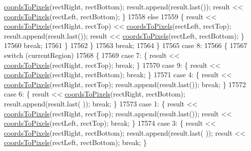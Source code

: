 \begin{DoxyCode}
      \hyperlink{class_q_c_p_abstract_plottable_ade710a776104b14c1c835168ce1bfc5c}{coordsToPixels}(rectRight, rectBottom); result.append(result.last()); result << 
      \hyperlink{class_q_c_p_abstract_plottable_ade710a776104b14c1c835168ce1bfc5c}{coordsToPixels}(rectLeft, rectBottom); \}
17558           \textcolor{keywordflow}{else}
17559           \{ result << \hyperlink{class_q_c_p_abstract_plottable_ade710a776104b14c1c835168ce1bfc5c}{coordsToPixels}(rectRight, rectTop) << 
      \hyperlink{class_q_c_p_abstract_plottable_ade710a776104b14c1c835168ce1bfc5c}{coordsToPixels}(rectLeft, rectTop); result.append(result.last()); result << 
      \hyperlink{class_q_c_p_abstract_plottable_ade710a776104b14c1c835168ce1bfc5c}{coordsToPixels}(rectLeft, rectBottom); \}
17560           \textcolor{keywordflow}{break};
17561         \}
17562       \}
17563       \textcolor{keywordflow}{break};
17564     \}
17565     \textcolor{keywordflow}{case} 8:
17566     \{
17567       \textcolor{keywordflow}{switch} (currentRegion)
17568       \{
17569         \textcolor{keywordflow}{case} 7: \{ result << \hyperlink{class_q_c_p_abstract_plottable_ade710a776104b14c1c835168ce1bfc5c}{coordsToPixels}(rectRight, rectTop); \textcolor{keywordflow}{break}; \}
17570         \textcolor{keywordflow}{case} 9: \{ result << \hyperlink{class_q_c_p_abstract_plottable_ade710a776104b14c1c835168ce1bfc5c}{coordsToPixels}(rectRight, rectBottom); \textcolor{keywordflow}{break}; \}
17571         \textcolor{keywordflow}{case} 4: \{ result << \hyperlink{class_q_c_p_abstract_plottable_ade710a776104b14c1c835168ce1bfc5c}{coordsToPixels}(rectRight, rectTop); result.append(result.last());
       \textcolor{keywordflow}{break}; \}
17572         \textcolor{keywordflow}{case} 6: \{ result << \hyperlink{class_q_c_p_abstract_plottable_ade710a776104b14c1c835168ce1bfc5c}{coordsToPixels}(rectRight, rectBottom); result.append(result.last(
      )); \textcolor{keywordflow}{break}; \}
17573         \textcolor{keywordflow}{case} 1: \{ result << \hyperlink{class_q_c_p_abstract_plottable_ade710a776104b14c1c835168ce1bfc5c}{coordsToPixels}(rectRight, rectTop); result.append(result.last());
       result << \hyperlink{class_q_c_p_abstract_plottable_ade710a776104b14c1c835168ce1bfc5c}{coordsToPixels}(rectLeft, rectTop); \textcolor{keywordflow}{break}; \}
17574         \textcolor{keywordflow}{case} 3: \{ result << \hyperlink{class_q_c_p_abstract_plottable_ade710a776104b14c1c835168ce1bfc5c}{coordsToPixels}(rectRight, rectBottom); result.append(result.last(
      )); result << \hyperlink{class_q_c_p_abstract_plottable_ade710a776104b14c1c835168ce1bfc5c}{coordsToPixels}(rectLeft, rectBottom); \textcolor{keywordflow}{break}; \}

\end{DoxyCode}
